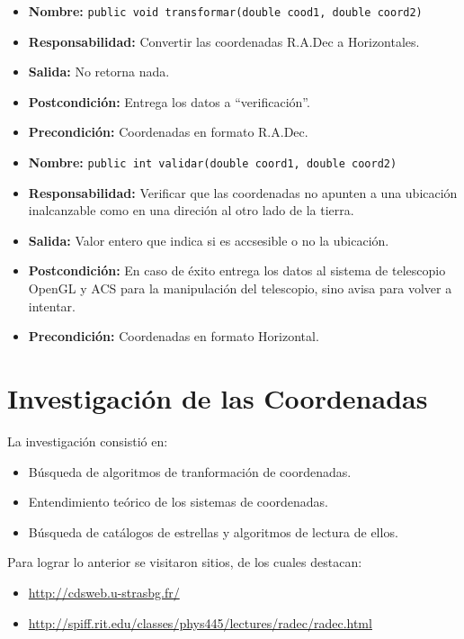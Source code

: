\documentclass[letterpaper,spanish,10pt]{article}
\begin{document}
\begin{itemize}
\item \textbf{Nombre:} \texttt{public void transformar(double cood1, double coord2)}
\item \textbf{Responsabilidad:} Convertir las coordenadas R.A.Dec a Horizontales.
\item \textbf{Salida:} No retorna nada.
\item \textbf{Postcondici\'on:} Entrega los datos a ``verificaci\'on''.
\item \textbf{Precondici\'on:} Coordenadas en formato R.A.Dec.
\end{itemize}

\begin{itemize}
\item \textbf{Nombre:} \texttt{public int validar(double coord1, double coord2)}
\item \textbf{Responsabilidad:} Verificar que las coordenadas no apunten a una ubicaci\'on inalcanzable como en una direci\'on al otro lado de la tierra.
\item \textbf{Salida:} Valor entero que indica si es accsesible o no la ubicaci\'on.
\item \textbf{Postcondici\'on:} En caso de \'exito entrega los datos al sistema de telescopio OpenGL y ACS para la manipulaci\'on del telescopio, sino avisa para volver a intentar.
\item \textbf{Precondici\'on:} Coordenadas en formato Horizontal.
\end{itemize}


\section{Investigaci\'on de las Coordenadas}

La investigaci\'on consisti\'o en:

\begin{itemize}
	\item B\'usqueda de algoritmos de tranformaci\'on de coordenadas.
	\item Entendimiento te\'orico de los sistemas de coordenadas.
	\item B\'usqueda de cat\'alogos de estrellas y algoritmos de lectura de ellos.
\end{itemize}

Para lograr lo anterior se visitaron sitios, de los cuales destacan:

\begin{itemize}
	\item \url{http://cdsweb.u-strasbg.fr/}
	\item \url{http://spiff.rit.edu/classes/phys445/lectures/radec/radec.html}
\end{itemize}
\end{document}
